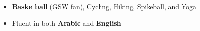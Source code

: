 \documentclass[10pt,a4paper,ragged2e]{altacv}
\begin{document}




\begin{itemize}
  \item {\bfseries Basketball} (GSW fan), Cycling, Hiking, Spikeball, and Yoga\\
  \item Fluent in both {\bfseries Arabic} and {\bfseries English}
\end{itemize}




\end{document}
